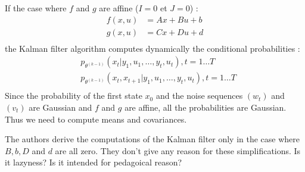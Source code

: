 If the case where $f$ and $g$ are affine ($I=0$ et $J=0$) :
\begin{align*}
  f(x,u) &= Ax + Bu + b\\
  g(x,u) &= Cx + Du + d\\
\end{align*}
the Kalman filter algorithm computes dynamically the conditional probabilities :
\begin{align*}
  &p_{\theta^{(k-1)}}\left(x_t|y_1, u_1, \ldots, y_t, u_t \right ), t=1 \ldots T\\
  &p_{\theta^{(k-1)}}\left(x_t, x_{t+1}|y_1, u_1, \ldots, y_t, u_t \right ), t=1 \ldots T\\
\end{align*}
Since the probability of the first state $x_0$ and the noise sequences $(w_t)$ and $(v_t)$ are Gaussian and $f$ and $g$ are affine, all the probabilities are Gaussian.
Thus we need to compute means and covariances.

The authors derive the computations of the Kalman filter only in the case where $B,b,D$ and $d$ are all zero.
They don't give any reason for these simplifications.
Is it lazyness?
Is it intended for pedagoical reason?

